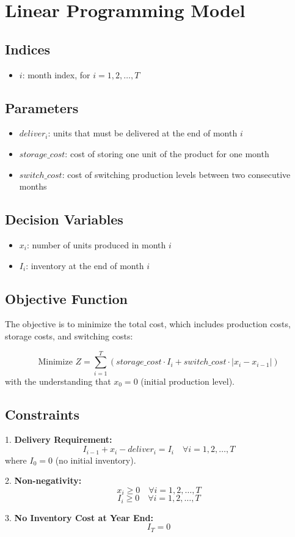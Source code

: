 \documentclass{article}
\begin{document}
\section*{Linear Programming Model}

\subsection*{Indices}
\begin{itemize}
    \item $i$: month index, for $i = 1, 2, \ldots, T$
\end{itemize}

\subsection*{Parameters}
\begin{itemize}
    \item $deliver_i$: units that must be delivered at the end of month $i$
    \item $storage\_cost$: cost of storing one unit of the product for one month
    \item $switch\_cost$: cost of switching production levels between two consecutive months
\end{itemize}

\subsection*{Decision Variables}
\begin{itemize}
    \item $x_i$: number of units produced in month $i$
    \item $I_i$: inventory at the end of month $i$
\end{itemize}

\subsection*{Objective Function}
The objective is to minimize the total cost, which includes production costs, storage costs, and switching costs:

\[
\text{Minimize } Z = \sum_{i=1}^{T} \left( storage\_cost \cdot I_i + switch\_cost \cdot |x_{i} - x_{i-1}| \right)
\]
with the understanding that $x_0 = 0$ (initial production level).

\subsection*{Constraints}
1. \textbf{Delivery Requirement:}
   \[
   I_{i-1} + x_i - deliver_i = I_i \quad \forall i = 1, 2, \ldots, T
   \]
   where $I_0 = 0$ (no initial inventory).

2. \textbf{Non-negativity:}
   \[
   x_i \geq 0 \quad \forall i = 1, 2, \ldots, T
   \]
   \[
   I_i \geq 0 \quad \forall i = 1, 2, \ldots, T
   \]

3. \textbf{No Inventory Cost at Year End:}
   \[
   I_T = 0
   \]
\end{document}
